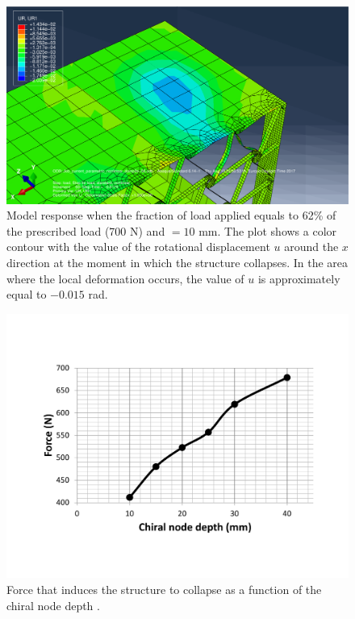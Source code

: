       \begin{figure}[!htpb] %
        \centering
        \includegraphics[width=0.8 \textwidth]{../figures/result-sim/B/10_UR1}
        \caption[Model response when the fraction of load applied equals to 62\% of the prescribed load (700 N) and \chiB$= 10$ mm]{Model response when the fraction of load applied equals to 62\% of the prescribed load (700 N) and \chiB$= 10$ mm. The plot shows a color contour with the value of the rotational displacement $u$ around the $x$ direction at the moment in which the structure collapses. In the area where the local deformation occurs, the value of $u$ is approximately equal to $-0.015$ rad.}
        \label{fig:10_UR1}
      \end{figure}

      \begin{figure}[!htpb] %
        \centering
        \includegraphics[width=0.8 \textwidth]{../figures/result-sim/B/force_B}
        \caption[Force that induces the structure to collapse as a function of the chiral node depth]{Force that induces the structure to collapse as a function of the chiral node depth \chiB.}\label{fig:force_B}
      \end{figure}

